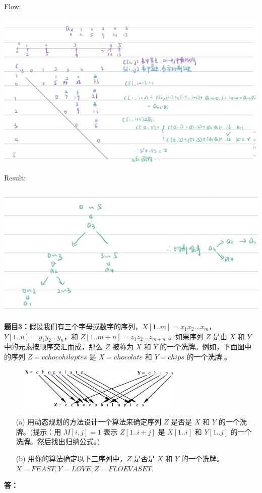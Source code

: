 \documentclass[12pt,a4paper]{article}
\begin{document}
\begin{CJK*}{UTF8}{gbsn}
Flow:

\includegraphics[width=15cm]{img/answ2.jpg}

	Result:

  \includegraphics[width=15cm]{img/answ2_2.jpg}

	\vspace{10pt}
	\noindent
	{\bf 题目3：}假设我们有三个字母或数字的序列，$X[1..m]  = x_1x_2 ... x_m$， $Y[1..n]  = y_1y_2...y_n$，和 $Z[1..m+n] = z_1z_2...z_{m+n}$ 。如果序列 $Z$ 是由 $X$ 和 $Y$ 中的元素按顺序交汇而成，那么 $Z$  被称为 $X$ 和 $Y$ 的一个洗牌。例如，下面图中的序列 $Z = cchocohilaptes$ 是 $X = chocolate$ 和 $Y = chips$ 的一个洗牌 。
	\begin{figure}[h]
		\centering %
		\includegraphics[width=0.7\textwidth]{3} %
	\end{figure}
	\begin{enumerate}
		\item[(a)]  用动态规划的方法设计一个算法来确定序列 $Z$ 是否是 $X$ 和 $Y$ 的一个洗牌。(提示：用 $M[i, j] = 1$ 表示 $Z[1..i+j]$ 是 $X[1..i]$ 和 $Y[1..j]$ 的一个洗牌。然后找出归纳公式。)
		\item[(b)]  用你的算法确定以下三序列中，$Z$ 是否是 $X$ 和 $Y$ 的一个洗牌。\\
			$X = FEAST, 	Y = LOVE, 	Z =  FLOEVASET$.
	\end{enumerate}
	\vspace{5pt}
	\noindent
	{\bf 答：}


\end{CJK*}
\end{document}
